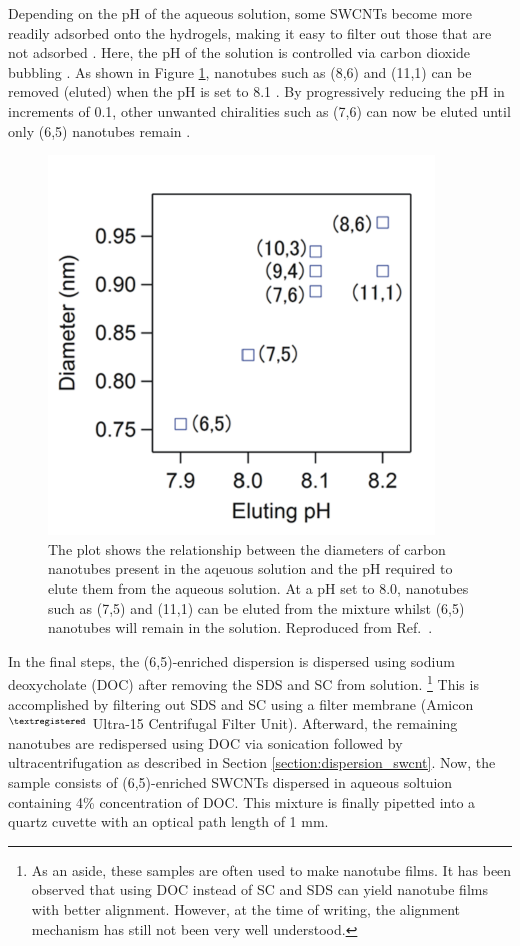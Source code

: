 Depending on the pH of the aqueous solution, some SWCNTs become more readily adsorbed onto the hydrogels, making it easy to filter out those that are not adsorbed \cite{ichinose2017extraction}. Here, the pH of the solution is controlled via carbon dioxide bubbling \cite{ichinose2017extraction}. As shown in Figure \ref{fig:elute_ph}, nanotubes such as (8,6) and (11,1) can be removed (eluted) when the pH is set to 8.1 \cite{ichinose2017extraction}. By progressively reducing the pH in increments of 0.1, other unwanted chiralities such as (7,6) can now be eluted until only (6,5) nanotubes remain \cite{ichinose2017extraction}.

\begin{figure}[ht]
	\centering
	\includegraphics{images/chapter_methods/elute_ph}
	\caption{The plot shows the relationship between the diameters of carbon nanotubes present in the aqeuous solution and the pH required to elute them from the aqueous solution. At a pH set to $8.0$, nanotubes such as (7,5) and (11,1) can be eluted from the mixture whilst (6,5) nanotubes will remain in the solution.  Reproduced from Ref.\ \cite{ichinose2017extraction}.}
	\label{fig:elute_ph}
\end{figure}

In the final steps, the (6,5)-enriched dispersion is dispersed using sodium deoxycholate (DOC) after removing the SDS and SC from solution. \footnote{As an aside, these samples are often used to make nanotube films. It has been observed that using DOC instead of SC and SDS can yield nanotube films with better alignment. However, at the time of writing, the alignment mechanism has still not been very well understood.} This is accomplished by filtering out SDS and SC using a filter membrane (Amicon$^{\tiny\textregistered}$ Ultra-15 Centrifugal Filter Unit). Afterward, the remaining nanotubes are redispersed using DOC via sonication followed by ultracentrifugation as described in Section \ref{section:dispersion_swcnt}. Now, the sample consists of (6,5)-enriched SWCNTs dispersed in aqueous soltuion containing 4\% concentration of DOC. This mixture is finally pipetted into a quartz cuvette with an optical path length of 1 mm.

